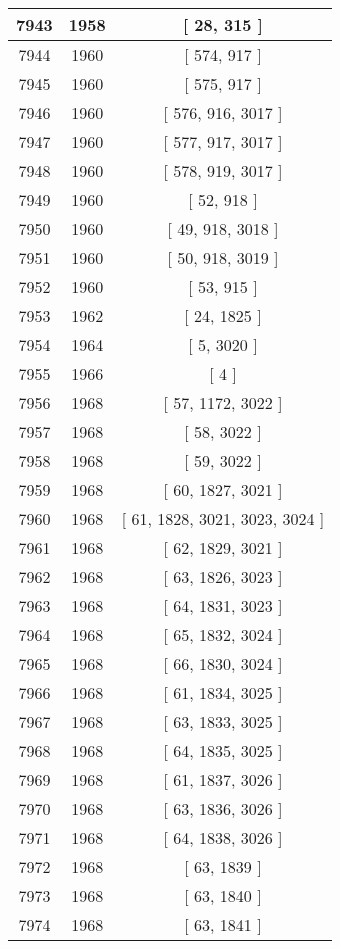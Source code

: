 \begin{center}
\begin{longtable}[H]{|| c c c ||}
\hline
7943 & 1958 & [ 28, 315 ] \\ 
\hline
7944 & 1960 & [ 574, 917 ] \\ 
\hline
7945 & 1960 & [ 575, 917 ] \\ 
\hline
7946 & 1960 & [ 576, 916, 3017 ] \\ 
\hline
7947 & 1960 & [ 577, 917, 3017 ] \\ 
\hline
7948 & 1960 & [ 578, 919, 3017 ] \\ 
\hline
7949 & 1960 & [ 52, 918 ] \\ 
\hline
7950 & 1960 & [ 49, 918, 3018 ] \\ 
\hline
7951 & 1960 & [ 50, 918, 3019 ] \\ 
\hline
7952 & 1960 & [ 53, 915 ] \\ 
\hline
7953 & 1962 & [ 24, 1825 ] \\ 
\hline
7954 & 1964 & [ 5, 3020 ] \\ 
\hline
7955 & 1966 & [ 4 ] \\ 
\hline
7956 & 1968 & [ 57, 1172, 3022 ] \\ 
\hline
7957 & 1968 & [ 58, 3022 ] \\ 
\hline
7958 & 1968 & [ 59, 3022 ] \\ 
\hline
7959 & 1968 & [ 60, 1827, 3021 ] \\ 
\hline
7960 & 1968 & [ 61, 1828, 3021, 3023, 3024 ] \\ 
\hline
7961 & 1968 & [ 62, 1829, 3021 ] \\ 
\hline
7962 & 1968 & [ 63, 1826, 3023 ] \\ 
\hline
7963 & 1968 & [ 64, 1831, 3023 ] \\ 
\hline
7964 & 1968 & [ 65, 1832, 3024 ] \\ 
\hline
7965 & 1968 & [ 66, 1830, 3024 ] \\ 
\hline
7966 & 1968 & [ 61, 1834, 3025 ] \\ 
\hline
7967 & 1968 & [ 63, 1833, 3025 ] \\ 
\hline
7968 & 1968 & [ 64, 1835, 3025 ] \\ 
\hline
7969 & 1968 & [ 61, 1837, 3026 ] \\ 
\hline
7970 & 1968 & [ 63, 1836, 3026 ] \\ 
\hline
7971 & 1968 & [ 64, 1838, 3026 ] \\ 
\hline
7972 & 1968 & [ 63, 1839 ] \\ 
\hline
7973 & 1968 & [ 63, 1840 ] \\ 
\hline
7974 & 1968 & [ 63, 1841 ] \\ 

\end{longtable}
\end{center}
